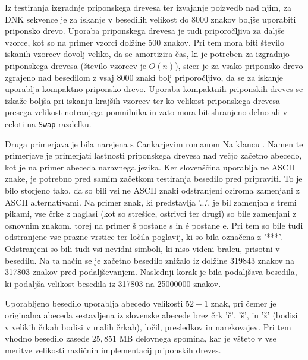Iz testiranja izgradnje priponskega drevesa ter izvajanje poizvedb nad njim, za DNK sekvence je za iskanje v besedilih velikost do 8000 znakov boljše uporabiti priponsko drevo. Uporaba priponskega drevesa je tudi priporočljiva za daljše vzorce, kot so na primer vzorci dolžine 500 znakov. Pri tem mora biti število iskanih vzorcev dovolj veliko, da se amortizira čas, ki je potreben za izgradnjo priponskega drevesa (število vzorcev je $O(n)$), sicer je za vsako priponsko drevo zgrajeno nad besedilom z vsaj 8000 znaki bolj priporočljivo, da se za iskanje uporablja kompaktno priponsko drevo. Uporaba kompaktnih priponskih dreves se izkaže boljša pri iskanju krajših vzorcev ter ko velikost priponskega drevesa presega velikost notranjega pomnilnika in zato mora bit shranjeno delno ali v celoti na \verb|Swap| razdelku.

Druga primerjava je bila narejena s Cankarjevim romanom Na klancu \cite{podatkiNaKlancu}. Namen te primerjave je primerjati lastnosti priponskega drevesa nad večjo začetno abecedo, kot je na primer abeceda naravnega jezika. Ker slovenščina uporablja ne ASCII znake, je potrebno pred samim začetkom testiranja besedilo pred pripraviti. To je bilo storjeno tako, da so bili vsi ne ASCII znaki odstranjeni oziroma zamenjani z ASCII alternativami. Na primer znak, ki predstavlja '...', je bil zamenjan s tremi pikami, vse črke z naglasi (kot so strešice, ostrivci ter drugi) so bile zamenjani z osnovnim znakom, torej na primer š postane s in é postane e. Pri tem so bile tudi odstranjene vse prazne vrstice ter ločila poglavij, ki so bila označena z '***'. Odstranjeni so bili tudi vsi nevidni simboli, ki niso videni bralcu, prisotni v besedilu. Na ta način se je začetno besedilo znižalo iz dolžine 319843 znakov na 317803 znakov pred podaljševanjem. Naslednji korak je bila podaljšava besedila, ki podaljša velikost besedila iz 317803 na 25000000 znakov.

Uporabljeno besedilo uporablja abecedo velikosti $52+1$ znak, pri čemer je originalna abeceda sestavljena iz slovenske abecede brez črk 'č', 'š', in 'ž' (bodisi v velikih črkah bodisi v malih črkah), ločil, presledkov in narekovajev. Pri tem vhodno besedilo zasede $25,851$ MB delovnega spomina, kar je všteto v vse meritve velikosti različnih implementacij priponskih dreves.

